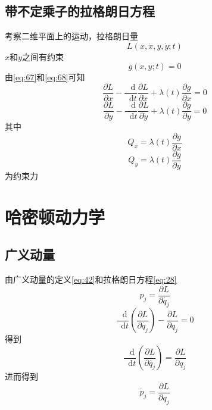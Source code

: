 \documentclass{article}
\newcommand*{\dif}{\mathop{}\!\mathrm{d}}
\begin{document}
\subsection{带不定乘子的拉格朗日方程}
考察二维平面上的运动，拉格朗日量
\begin{equation}
  \label{eq:69}
  L \left( x, \dot{x}, y, \dot{y}; t \right)
\end{equation}
$x$和$y$之间有约束
\begin{equation}
  \label{eq:70}
  g \left( x, y ;t \right) = 0
\end{equation}
由\ref{eq:67}和\ref{eq:68}可知
\begin{equation}
  \label{eq:71}
  \dfrac{\partial L}{\partial x} - \dfrac{\dif}{\dif t} \dfrac{\partial L}{\partial \dot{x}} + \lambda (t) \dfrac{\partial g}{\partial x} = 0
\end{equation}
\begin{equation}
  \label{eq:72}
  \dfrac{\partial L}{\partial y} - \dfrac{\dif}{\dif t} \dfrac{\partial L}{\partial \dot{y}}  + \lambda (t) \dfrac{\partial g}{\partial y} = 0
\end{equation}
其中
\begin{equation}
  \label{eq:73}
  Q_{x} = \lambda (t) \dfrac{\partial g}{\partial x} 
\end{equation}
\begin{equation}
  \label{eq:74}
  Q_{y} =  \lambda (t) \dfrac{\partial g}{\partial y} 
\end{equation}
为约束力

\section{哈密顿动力学}

\subsection{广义动量}
由广义动量的定义\ref{eq:42}和拉格朗日方程\ref{eq:28}
\begin{equation}
  \label{eq:75}
  p_{j} = \frac{\partial L}{\partial \dot{q_{j}}}
\end{equation}
\begin{equation}
  \label{eq:76}
  \frac{\dif}{\dif t} \left( \frac{\partial L}{\partial \dot{q_{j}}} \right) - \frac{\partial L}{\partial q_{j}} = 0
\end{equation}
得到
\begin{equation}
  \label{eq:77}
  \frac{\dif}{\dif t} \left( \frac{\partial L}{\partial \dot{q_{j}}} \right) = \frac{\partial L}{\partial q_{j}}
\end{equation}
进而得到
\begin{equation}
  \label{eq:78}
  \dot{p}_{j} = \frac{\partial L}{\partial q_{j}}
\end{equation}
\end{document}
